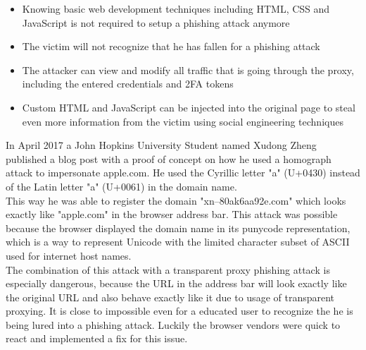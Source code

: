 \documentclass[12pt]{scrbook}
\begin{document}
\begin{itemize}
  \item Knowing basic web development techniques including HTML,
    CSS and JavaScript is not required to setup a phishing attack anymore
  \item The victim will not recognize that he has fallen for a phishing attack
  \item The attacker can view and modify all traffic that is going through the
    proxy, including the entered credentials and 2FA tokens
  \item Custom HTML and JavaScript can be injected into the original page to
    steal even more information from the victim using social engineering techniques
\end{itemize}

In April 2017 a John Hopkins University Student named Xudong Zheng published a
blog post with a proof of concept on how he used a homograph attack to
impersonate apple.com. He used the Cyrillic letter "a" (U+0430) instead of the
Latin letter "a" (U+0061) in the domain name.\\This way he was able to register
the domain "xn--80ak6aa92e.com" which looks exactly like "apple.com" in the
browser address bar. This attack was possible because the browser displayed the
domain name in its punycode representation, which is a way to represent Unicode
with the limited character subset of ASCII used for internet host names.\\ The
combination of this attack with a transparent proxy phishing attack is
especially dangerous, because the URL in the address bar will look exactly like
the original URL and also behave exactly like it due to usage of transparent
proxying. It is close to impossible even for a educated user to recognize the he
is being lured into a phishing attack. Luckily the browser vendors were quick to
react and implemented a fix for this issue.
\end{document}
